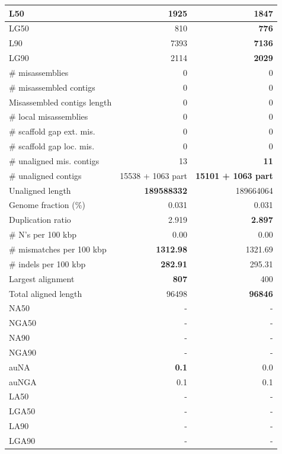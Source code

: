 \documentclass[12pt,a4paper]{article}
\begin{document}
\begin{table}[ht]
\begin{center}
\begin{tabular}{|l*{2}{|r}|}
L50 & 1925 & {\bf 1847} \\ \hline
LG50 & 810 & {\bf 776} \\ \hline
L90 & 7393 & {\bf 7136} \\ \hline
LG90 & 2114 & {\bf 2029} \\ \hline
\# misassemblies & 0 & 0 \\ \hline
\# misassembled contigs & 0 & 0 \\ \hline
Misassembled contigs length & 0 & 0 \\ \hline
\# local misassemblies & 0 & 0 \\ \hline
\# scaffold gap ext. mis. & 0 & 0 \\ \hline
\# scaffold gap loc. mis. & 0 & 0 \\ \hline
\# unaligned mis. contigs & 13 & {\bf 11} \\ \hline
\# unaligned contigs & 15538 + 1063 part & {\bf 15101 + 1063 part} \\ \hline
Unaligned length & {\bf 189588332} & 189664064 \\ \hline
Genome fraction (\%) & 0.031 & 0.031 \\ \hline
Duplication ratio & 2.919 & {\bf 2.897} \\ \hline
\# N's per 100 kbp & 0.00 & 0.00 \\ \hline
\# mismatches per 100 kbp & {\bf 1312.98} & 1321.69 \\ \hline
\# indels per 100 kbp & {\bf 282.91} & 295.31 \\ \hline
Largest alignment & {\bf 807} & 400 \\ \hline
Total aligned length & 96498 & {\bf 96846} \\ \hline
NA50 & - & - \\ \hline
NGA50 & - & - \\ \hline
NA90 & - & - \\ \hline
NGA90 & - & - \\ \hline
auNA & {\bf 0.1} & 0.0 \\ \hline
auNGA & 0.1 & 0.1 \\ \hline
LA50 & - & - \\ \hline
LGA50 & - & - \\ \hline
LA90 & - & - \\ \hline
LGA90 & - & - \\ \hline
\end{tabular}
\end{center}
\end{table}
\end{document}
